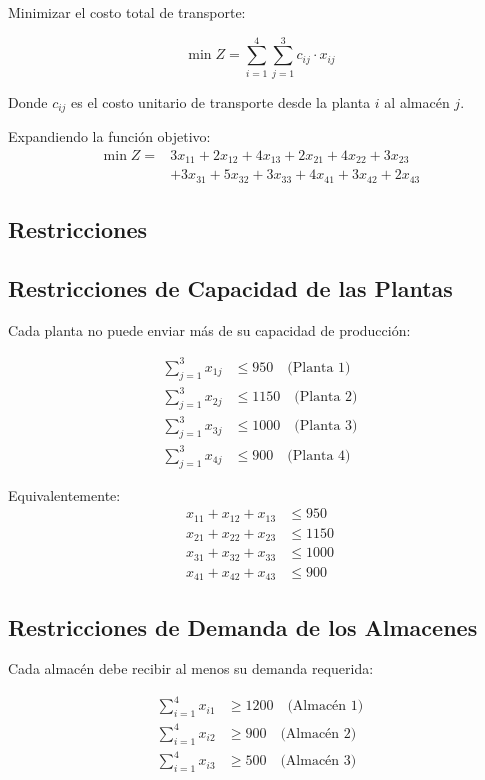 \documentclass[12pt, a4paper, oneside]{book}
\theoremstyle{definition}
\begin{document}
Minimizar el costo total de transporte:

$$\min Z = \sum_{i=1}^{4} \sum_{j=1}^{3} c_{ij} \cdot x_{ij}$$

Donde $c_{ij}$ es el costo unitario de transporte desde la planta $i$ al almacén $j$.

Expandiendo la función objetivo:
\begin{align}
\min Z = &3x_{11} + 2x_{12} + 4x_{13} + 2x_{21} + 4x_{22} + 3x_{23} \nonumber \\
&+ 3x_{31} + 5x_{32} + 3x_{33} + 4x_{41} + 3x_{42} + 2x_{43}
\end{align}

\subsection{Restricciones}

\subsection{Restricciones de Capacidad de las Plantas}
Cada planta no puede enviar más de su capacidad de producción:

\begin{align}
\sum_{j=1}^{3} x_{1j} &\leq 950 \quad \text{(Planta 1)} \\
\sum_{j=1}^{3} x_{2j} &\leq 1150 \quad \text{(Planta 2)} \\
\sum_{j=1}^{3} x_{3j} &\leq 1000 \quad \text{(Planta 3)} \\
\sum_{j=1}^{3} x_{4j} &\leq 900 \quad \text{(Planta 4)}
\end{align}

Equivalentemente:
\begin{align}
x_{11} + x_{12} + x_{13} &\leq 950 \\
x_{21} + x_{22} + x_{23} &\leq 1150 \\
x_{31} + x_{32} + x_{33} &\leq 1000 \\
x_{41} + x_{42} + x_{43} &\leq 900
\end{align}

\subsection{Restricciones de Demanda de los Almacenes}
Cada almacén debe recibir al menos su demanda requerida:

\begin{align}
\sum_{i=1}^{4} x_{i1} &\geq 1200 \quad \text{(Almacén 1)} \\
\sum_{i=1}^{4} x_{i2} &\geq 900 \quad \text{(Almacén 2)} \\
\sum_{i=1}^{4} x_{i3} &\geq 500 \quad \text{(Almacén 3)}
\end{align}
\end{document}
